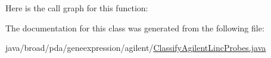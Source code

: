 Here is the call graph for this function\+:




The documentation for this class was generated from the following file\+:\begin{DoxyCompactItemize}
\item 
java/broad/pda/geneexpression/agilent/\hyperlink{_classify_agilent_linc_probes_8java}{Classify\+Agilent\+Linc\+Probes.\+java}\end{DoxyCompactItemize}
